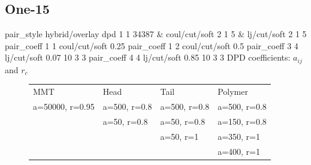 \documentclass[a4paper]{article}
\begin{document}
\subsection*{One-15}
pair\_style hybrid/overlay dpd 1 1 34387 \& coul/cut/soft 2 1 5 \& 
lj/cut/soft 2 1 5\newline
pair\_coeff 1 1 coul/cut/soft 0.25
pair\_coeff 1 2 coul/cut/soft 0.5\newline
pair\_coeff 3 4 lj/cut/soft 0.07    10 3 3\newline
pair\_coeff 4 4 lj/cut/soft 0.85    10 3 3\newline
DPD coefficients: $a_{ij}$ and $r_c$
\begin{figure}[H]\begin{tabular}{llll}
MMT             & Head         & Tail         & Polymer      \\
a=50000, r=0.95 & a=500, r=0.8 & a=500, r=0.8 & a=500, r=0.8 \\
                & a=50,  r=0.8 & a=50,  r=0.8 & a=150, r=0.8 \\
                &              & a=50,  r=1   & a=350, r=1   \\
                &              &              & a=400, r=1   \\
\end{tabular}\end{figure}
\end{document}
